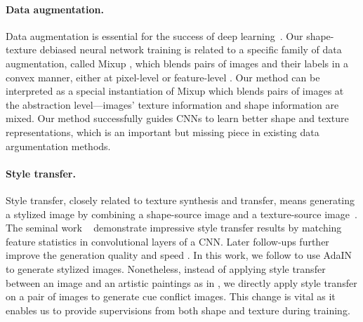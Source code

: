 \documentclass{article} \usepackage{iclr2021_conference,times}
\begin{document}
\paragraph{Data augmentation.}
Data augmentation is essential for the success of deep learning~\citep{lecun1998gradient,Krizhevsky2012,simonyan2014very,zhong2017random,
cubuk2019autoaugment,lim2019fast,cubuk2020randaugment}.
Our shape-texture debiased neural network training is related to a specific family of data augmentation, called Mixup \citep{zhang2018mixup}, which blends pairs of images and their labels in a convex manner, either at pixel-level \citep{zhang2018mixup,yun2019cutmix} or feature-level \citep{verma2019manifold,li2020feature}.
Our method can be interpreted as a special instantiation of Mixup which blends pairs of images at the abstraction level---images' texture information and shape information are mixed.  Our method successfully guides CNNs to learn better shape and texture representations, which is an important but missing piece in existing data argumentation methods.

\paragraph{Style transfer.} Style transfer, closely related to texture synthesis and transfer, means generating a stylized image by combining a shape-source image and a texture-source image~\citep{efros1999texture,efros2001image,elad2017style}. The seminal work ~\citep{gatys2016image} demonstrate impressive style transfer results by matching feature statistics in convolutional layers of a CNN. Later follow-ups further improve the generation quality and speed
\citep{huang2017arbitrary,chen2016fast,ghiasi2017exploring,li2017universal}. 
In this work, we follow \citet{geirhos2018imagenettrained} to use AdaIN \citep{huang2017arbitrary} to generate stylized images. Nonetheless, instead of applying style transfer between an image and an artistic paintings as in \citet{geirhos2018imagenettrained}, we directly apply style transfer on a pair of images to generate cue conflict images.
This change is vital as it enables us to provide supervisions from both shape and texture during training.
\end{document}
